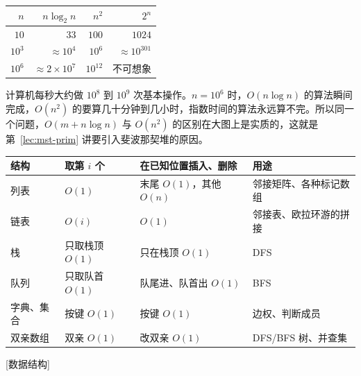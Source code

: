 \begin{center}
\begin{tabular}{rrrr}
\toprule
$n$ & $n\log_2n$ & $n^2$ & $2^n$ \\
\midrule
$10$ & $33$ & $100$ & $1024$ \\
$10^3$ & $\approx10^4$ & $10^6$ & $\approx10^{301}$ \\
$10^6$ & $\approx2\times10^7$ & $10^{12}$ & 不可想象 \\
\bottomrule
\end{tabular}
\end{center}

计算机每秒大约做 $10^8$ 到 $10^9$ 次基本操作。$n=10^6$ 时，$O(n\log n)$ 的算法瞬间完成，$O(n^2)$ 的要算几十分钟到几小时，指数时间的算法永远算不完。所以同一个问题，$O(m+n\log n)$ 与 $O(n^2)$ 的区别在大图上是实质的，这就是第~\ref{lec:mst-prim} 讲要引入斐波那契堆的原因。


\begin{center}
\begin{tabular}{llll}
\toprule
结构 & 取第 $i$ 个 & 在已知位置插入、删除 & 用途 \\
\midrule
列表 & $O(1)$ & 末尾 $O(1)$，其他 $O(n)$ & 邻接矩阵、各种标记数组 \\
链表 & $O(i)$ & $O(1)$ & 邻接表、欧拉环游的拼接 \\
栈 & 只取栈顶 $O(1)$ & 只在栈顶 $O(1)$ & DFS \\
队列 & 只取队首 $O(1)$ & 队尾进、队首出 $O(1)$ & BFS \\
字典、集合 & 按键 $O(1)$ & 按键 $O(1)$ & 边权、判断成员 \\
双亲数组 & 双亲 $O(1)$ & 改双亲 $O(1)$ & DFS/BFS 树、并查集 \\
\bottomrule
\end{tabular}
\end{center}

[数据结构]



